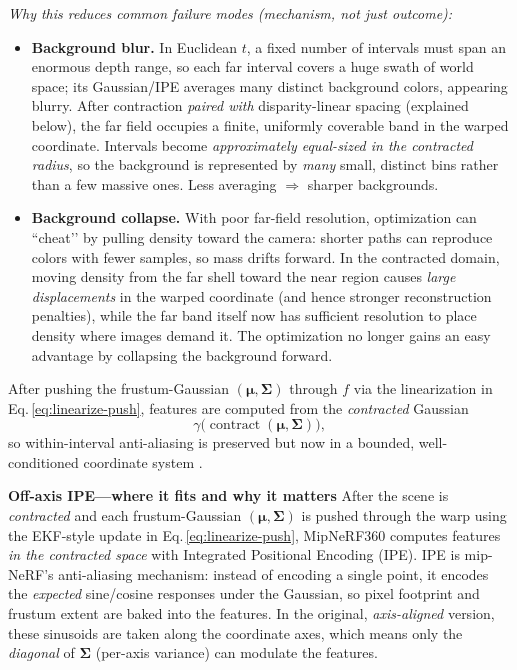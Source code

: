 \begin{enrichment}
\begin{enrichment}
        \emph{Why this reduces common failure modes (mechanism, not just outcome):}
        \begin{itemize}
            \item \textbf{Background blur.} In Euclidean $t$, a fixed number of intervals must span an enormous depth range, so each far interval covers a huge swath of world space; its Gaussian/IPE averages many distinct background colors, appearing blurry. After contraction \emph{paired with} disparity-linear spacing (explained below), the far field occupies a finite, uniformly coverable band in the warped coordinate. Intervals become \emph{approximately equal-sized in the contracted radius}, so the background is represented by \emph{many} small, distinct bins rather than a few massive ones. Less averaging $\Rightarrow$ sharper backgrounds.
            \item \textbf{Background collapse.} With poor far-field resolution, optimization can “cheat’’ by pulling density toward the camera: shorter paths can reproduce colors with fewer samples, so mass drifts forward. In the contracted domain, moving density from the far shell toward the near region causes \emph{large displacements} in the warped coordinate (and hence stronger reconstruction penalties), while the far band itself now has sufficient resolution to place density where images demand it. The optimization no longer gains an easy advantage by collapsing the background forward.
        \end{itemize}
        After pushing the frustum-Gaussian $(\boldsymbol\mu,\boldsymbol\Sigma)$ through $f$ via the linearization in Eq.\,\eqref{eq:linearize-push}, features are computed from the \emph{contracted} Gaussian
        \[
        \gamma\!\big(\operatorname{contract}(\boldsymbol\mu,\boldsymbol\Sigma)\big),
        \]
        so within-interval anti-aliasing is preserved but now in a bounded, well-conditioned coordinate system \cite{barron2022_mipnerf360}.
        
        \textbf{Off-axis IPE—where it fits and why it matters} After the scene is \emph{contracted} and each frustum-Gaussian $(\boldsymbol\mu,\boldsymbol\Sigma)$ is pushed through the warp using the EKF-style update in Eq.\,\eqref{eq:linearize-push}, MipNeRF360 computes features \emph{in the contracted space} with Integrated Positional Encoding (IPE). IPE is mip-NeRF’s anti-aliasing mechanism: instead of encoding a single point, it encodes the \emph{expected} sine/cosine responses under the Gaussian, so pixel footprint and frustum extent are baked into the features. In the original, \emph{axis-aligned} version, these sinusoids are taken along the coordinate axes, which means only the \emph{diagonal} of $\boldsymbol\Sigma$ (per-axis variance) can modulate the features.
        

\end{enrichment}
\end{enrichment}
